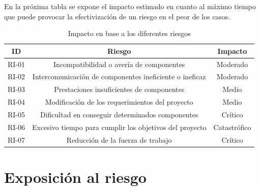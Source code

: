 En la próxima tabla se expone el impacto estimado en cuanto al máximo tiempo que puede provocar la efectivización de un riesgo en el peor de los casos.
\begin{table}[H]
\centering
\begin{tabular}{|c|c|c|}
    \hline \rowcolor{test_header_color}
        ID & Riesgo & Impacto \\
    \hline
        RI-01 & Incompatibilidad o avería de componentes & Moderado \cellcolor{green!65} \\
    \hline
        RI-02 & Intercomunicación de componentes ineficiente o ineficaz & Moderado \cellcolor{yellow!65} \\
    \hline
        RI-03 & Prestaciones insuficientes de componentes & Medio \cellcolor{yellow!65} \\
    \hline
        RI-04 & Modificación de los requerimientos del proyecto & Medio \cellcolor{orange!65} \\
    \hline
        RI-05 & Dificultad en conseguir determinados componentes & Crítico \cellcolor{orange!65} \\
    \hline
        RI-06 & Excesivo tiempo para cumplir los objetivos del proyecto & Catastrófico \cellcolor{red!65} \\
    \hline
        RI-07 & Reducción de la fuerza de trabajo & Crítico \cellcolor{orange!65} \\
    \hline
\end{tabular}
\caption{Impacto en base a los diferentes riesgos}
\end{table}

\section{Exposición al riesgo}

